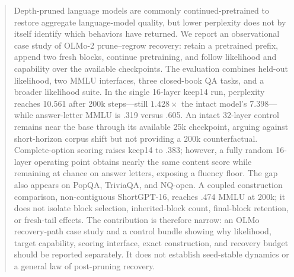 \begin{abstract}
Depth-pruned language models are commonly continued-pretrained to restore
aggregate language-model quality, but lower perplexity does not by itself
identify which behaviors have returned. We report an observational case study
of OLMo-2 prune--regrow recovery: retain a pretrained prefix, append two fresh
blocks, continue pretraining, and follow likelihood and capability over the
available checkpoints. The evaluation combines held-out likelihood, two MMLU
interfaces, three closed-book QA tasks, and a broader likelihood suite. In the
single 16-layer keep14 run, perplexity reaches 10.561 after 200k steps---still
$1.428\times$ the intact model's 7.398---while answer-letter MMLU is .319 versus
.605. An intact 32-layer control remains near the base through its available
25k checkpoint, arguing against short-horizon corpus shift but not providing a
200k counterfactual. Complete-option scoring raises keep14 to .383; however, a
fully random 16-layer operating point obtains nearly the same content score
while remaining at chance on answer letters, exposing a fluency floor. The gap
also appears on PopQA, TriviaQA, and NQ-open. A coupled construction comparison,
non-contiguous ShortGPT-16, reaches .474 MMLU at 200k; it does not isolate block
selection, inherited-block count, final-block retention, or fresh-tail effects.
The contribution is therefore narrow: an OLMo recovery-path case study and a
control bundle showing why likelihood, target capability, scoring interface,
exact construction, and recovery budget should be reported separately. It does
not establish seed-stable dynamics or a general law of post-pruning recovery.
\end{abstract}
